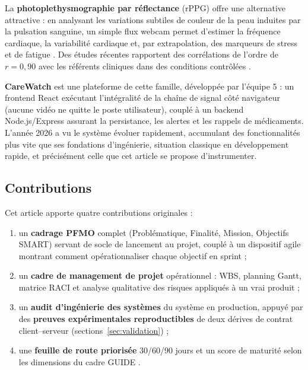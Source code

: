\documentclass[11pt,a4paper]{article}
\begin{document}
La \textbf{photoplethysmographie par réflectance} (rPPG) offre une alternative attractive : en analysant
les variations subtiles de couleur de la peau induites par la pulsation sanguine, un simple flux webcam
permet d'estimer la fréquence cardiaque, la variabilité cardiaque et, par extrapolation, des marqueurs
de stress et de fatigue \cite{mcduff2018, verkruysse2008}. Des études récentes rapportent des
corrélations de l'ordre de $r = 0{,}90$ avec les référents cliniques dans des conditions contrôlées
\cite{li2020}.

\textbf{CareWatch} est une plateforme de cette famille, développée par l'équipe 5 : un frontend
React exécutant l'intégralité de la chaîne de signal côté navigateur (aucune vidéo ne quitte le poste
utilisateur), couplé à un backend Node.js/Express assurant la persistance, les alertes et les rappels de
médicaments. L'année 2026 a vu le système évoluer rapidement, accumulant des fonctionnalités plus vite
que ses fondations d'ingénierie, situation classique en développement rapide, et précisément celle que
cet article se propose d'instrumenter.

\subsection*{Contributions}
Cet article apporte quatre contributions originales :
\begin{enumerate}[label=\textbf{C\arabic*.},leftmargin=2.2em]
 \item un \textbf{cadrage PFMO} complet (Problématique, Finalité, Mission, Objectifs SMART) servant de
 socle de lancement au projet, couplé à un dispositif agile montrant comment opérationnaliser
 chaque objectif en sprint ;
 \item un \textbf{cadre de management de projet} opérationnel : WBS, planning Gantt, matrice RACI et
 analyse qualitative des risques appliqués à un vrai produit ;
 \item un \textbf{audit d'ingénierie des systèmes} du système en production, appuyé par des
 \textbf{preuves expérimentales reproductibles} de deux dérives de contrat client--serveur
 (sections~\ref{sec:validation}) ;
 \item une \textbf{feuille de route priorisée} 30/60/90 jours et un score de maturité selon les
 dimensions du cadre GUIDE \cite{systemdesignskills}.
\end{enumerate}
\end{document}
